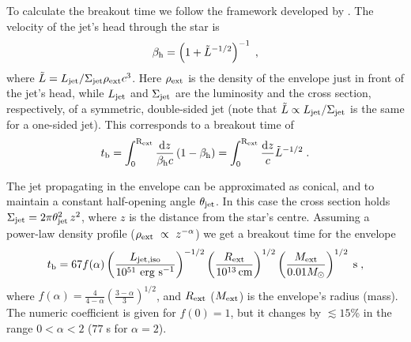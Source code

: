 \documentclass[useAMS,usenatbib]{mn2e}
\begin{document}
To calculate the breakout time we follow the framework developed by \citet{Bromberg2011}. The velocity of the jet's head through the star is
\begin{equation}
\label{eq:beta}
\beta_{\rm h}=\left(1+\tilde{L}^{-1/2}\right)^{-1}\;,
\end{equation}
where $\tilde{L}=L_{\rm jet}/\Sigma_{\rm jet}\rho_{\rm ext}c^3$. Here $\rho_{\rm ext}$ is the density of the envelope just in front of the jet's head, while $L_{\rm jet}$  and $\Sigma_{\rm jet}$ are the luminosity and the cross section, respectively, of a symmetric, double-sided jet (note that $\tilde{L}\propto L_{\rm jet}/\Sigma_{\rm jet}$ is the same for a one-sided jet). This corresponds to a breakout time of
\begin{equation}
t_{\rm b}=\int_0^{\rm R_{\rm ext}}\frac{\text{d}z}{\beta_{\rm h}c}\left(1-\beta_{\rm h}\right)=\int_0^{\rm R_{\rm ext}}\frac{\text{d}z}{c}\tilde{L}^{-1/2}\;.
\end{equation}

The jet propagating in the envelope can be approximated as conical, and to maintain a constant half-opening angle $\theta_{\rm jet}$. In this case the cross section holds $\Sigma_{\rm jet}=2\pi\theta_{\rm jet}^2\,z^2$, where $z$ is the distance from the star's centre. Assuming a power-law density profile ($\rho_{\rm ext}~\propto~z^{-\alpha}$) we get a breakout time for the envelope
\begin{equation}
t_{\rm b}=
67f(\alpha)\left(\frac{L_{\rm jet,iso}}{10^{51}\text{ erg s$^{-1}$}}\right)^{-1/2} \left(\frac{R_{\rm ext}}{10^{13}\text{\,cm}}\right)^{1/2} \left(\frac{M_{\rm ext}}{0.01M_\odot}\right)^{1/2}\text{\;s}\;,
\end{equation}
where $f(\alpha)=\frac{4}{4-\alpha}(\frac{3-\alpha}{3})^{1/2}$, and $R_{\rm ext}$ ($M_{\rm ext}$) is the envelope's radius (mass). The numeric coefficient is given for $f(0)=1$, but it changes by $\lesssim 15$\% in the range $0<\alpha<2$ ($77\;$s for $\alpha=2$).
\end{document}
